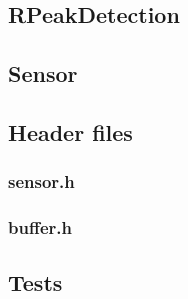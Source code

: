 \documentclass[12pt,a4paper]{article}
\begin{document}
\subsection{RPeakDetection}
\subsection{Sensor}
\subsection{Header files}
\subsubsection{sensor.h}
\subsubsection{buffer.h}
\subsection{Tests}
\end{document}
